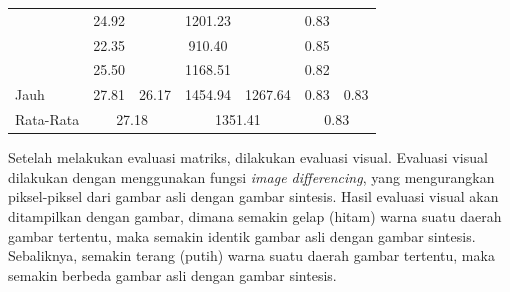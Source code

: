 \documentclass[conference]{IEEEtran}
\begin{document}
\begin{table}[]
\begin{tabular}{|l|cc|cc|cc|}
                                                      & \multicolumn{1}{c|}{\cellcolor[HTML]{FFFFFF}24.92} & \cellcolor[HTML]{FFFFFF}                         & \multicolumn{1}{c|}{\cellcolor[HTML]{FFFFFF}1201.23} & \cellcolor[HTML]{FFFFFF}                           & \multicolumn{1}{c|}{\cellcolor[HTML]{FFFFFF}0.83} & \cellcolor[HTML]{FFFFFF}                        \\ \cline{2-2} \cline{4-4} \cline{6-6}
                                                      & \multicolumn{1}{c|}{\cellcolor[HTML]{FFFFFF}22.35} & \cellcolor[HTML]{FFFFFF}                         & \multicolumn{1}{c|}{\cellcolor[HTML]{FFFFFF}910.40}  & \cellcolor[HTML]{FFFFFF}                           & \multicolumn{1}{c|}{\cellcolor[HTML]{FFFFFF}0.85} & \cellcolor[HTML]{FFFFFF}                        \\ \cline{2-2} \cline{4-4} \cline{6-6}
                                                      & \multicolumn{1}{c|}{\cellcolor[HTML]{FFFFFF}25.50} & \cellcolor[HTML]{FFFFFF}                         & \multicolumn{1}{c|}{\cellcolor[HTML]{FFFFFF}1168.51} & \cellcolor[HTML]{FFFFFF}                           & \multicolumn{1}{c|}{\cellcolor[HTML]{FFFFFF}0.82} & \cellcolor[HTML]{FFFFFF}                        \\ \cline{2-2} \cline{4-4} \cline{6-6}
  \multirow{-5}{*}{Jauh}  & \multicolumn{1}{c|}{\cellcolor[HTML]{FFFFFF}27.81} & \multirow{-5}{*}{\cellcolor[HTML]{FFFFFF}26.17} & \multicolumn{1}{c|}{\cellcolor[HTML]{FFFFFF}1454.94} & \multirow{-5}{*}{\cellcolor[HTML]{FFFFFF}1267.64} & \multicolumn{1}{c|}{\cellcolor[HTML]{FFFFFF}0.83} & \multirow{-5}{*}{\cellcolor[HTML]{FFFFFF}0.83} \\ \hline
  Rata-Rata                                           & \multicolumn{2}{c|}{\cellcolor[HTML]{FFFFFF}27.18}                                                    & \multicolumn{2}{c|}{1351.41}                                                                              & \multicolumn{2}{c|}{0.83}                                                                           \\ \hline
  \end{tabular}
\end{table}

Setelah melakukan evaluasi matriks, dilakukan evaluasi visual. 
Evaluasi visual dilakukan dengan menggunakan fungsi \emph{image differencing}, yang mengurangkan piksel-piksel dari gambar asli dengan gambar sintesis. 
Hasil evaluasi visual akan ditampilkan dengan gambar, dimana semakin gelap (hitam) warna suatu daerah gambar tertentu, maka semakin identik gambar asli dengan gambar sintesis. 
Sebaliknya, semakin terang (putih) warna suatu daerah gambar tertentu, maka semakin berbeda gambar asli dengan gambar sintesis.
\end{document}
